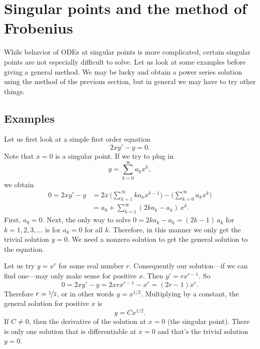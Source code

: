 
\sectionnewpage
\section{Singular points and the method of Frobenius}
\label{frobenius:section}


While behavior of ODEs at singular points is more complicated,
certain singular points are
not especially difficult to solve.  Let us look at some examples
before giving a general method.  We may be lucky and obtain a power series
solution using the method of the previous section, but in general we may
have to try other things.

\subsection{Examples}

\begin{example}
Let us first look at a simple first order equation 
\begin{equation*}
2 x y' - y = 0 .
\end{equation*}
Note that $x=0$ is a singular point.
If we try to plug in
\begin{equation*}
y = \sum_{k=0}^\infty a_k x^k ,
\end{equation*}
we obtain
\begin{equation*}
\begin{split}
0 = 2 xy'-y &= 
2x \, \Biggl( \sum_{k=1}^\infty k a_k x^{k-1}  \Biggr)
-
\Biggl( \sum_{k=0}^\infty a_k x^k \Biggr)
\\
& =
a_0 + 
\sum_{k=1}^\infty (2 k a_k - a_k) \, x^{k} .
\end{split}
\end{equation*}
First, $a_0 = 0$.  Next, the only way to solve
$0 = 2 k a_k - a_k = (2k-1) \, a_k$
for $k = 1,2,3,\dots$ is for $a_k = 0$ for all $k$.
Therefore, in this manner we only get the trivial solution $y=0$.  We need
a nonzero solution to get the general solution to the equation.

Let us try $y=x^r$
for some real number $r$.  
Consequently our solution---if we can
find one---may only make sense for positive $x$.
Then $y' = r x^{r-1}$.  So
\begin{equation*}
0 = 2 x y' - y = 2 x r x^{r-1} - x^r = (2r-1) x^r .
\end{equation*}
Therefore $r= \nicefrac{1}{2}$, or in other words $y = x^{1/2}$.
Multiplying by a constant, the general solution for positive $x$ is
\begin{equation*}
y = C x^{1/2} .
\end{equation*}
If $C \not= 0$, then
the derivative of the solution  at $x=0$ (the
singular point).  There is only one solution that is differentiable
at $x=0$ and that's the trivial solution $y=0$.
\end{example}

